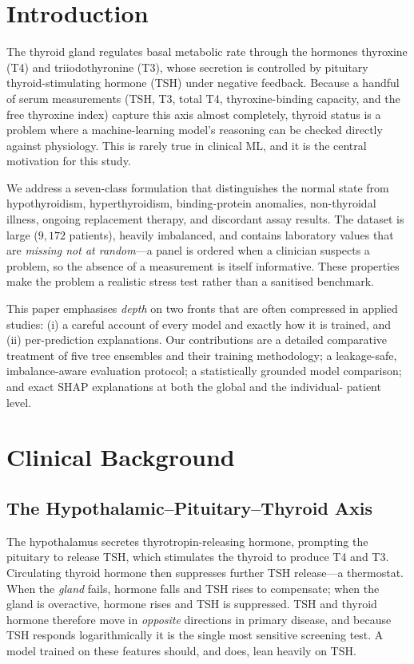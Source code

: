 \documentclass[conference]{IEEEtran}
\begin{document}
\section{Introduction}
The thyroid gland regulates basal metabolic rate through the hormones thyroxine
(T4) and triiodothyronine (T3), whose secretion is controlled by pituitary
thyroid-stimulating hormone (TSH) under negative feedback. Because a handful of
serum measurements (TSH, T3, total T4, thyroxine-binding capacity, and the free
thyroxine index) capture this axis almost completely, thyroid status is a problem
where a machine-learning model's reasoning can be checked directly against
physiology. This is rarely true in clinical ML, and it is the central motivation
for this study.

We address a seven-class formulation that distinguishes the normal state from
hypothyroidism, hyperthyroidism, binding-protein anomalies, non-thyroidal illness,
ongoing replacement therapy, and discordant assay results. The dataset is large
($9{,}172$ patients), heavily imbalanced, and contains laboratory values that are
\emph{missing not at random}---a panel is ordered when a clinician suspects a
problem, so the absence of a measurement is itself informative. These properties
make the problem a realistic stress test rather than a sanitised benchmark.

This paper emphasises \emph{depth} on two fronts that are often compressed in
applied studies: (i) a careful account of every model and exactly how it is
trained, and (ii) per-prediction explanations. Our contributions are a detailed
comparative treatment of five tree ensembles and their training methodology; a
leakage-safe, imbalance-aware evaluation protocol; a statistically grounded model
comparison; and exact SHAP explanations at both the global and the individual-
patient level.

\section{Clinical Background}
\subsection{The Hypothalamic--Pituitary--Thyroid Axis}
The hypothalamus secretes thyrotropin-releasing hormone, prompting the pituitary
to release TSH, which stimulates the thyroid to produce T4 and T3. Circulating
thyroid hormone then suppresses further TSH release---a thermostat. When the
\emph{gland} fails, hormone falls and TSH rises to compensate; when the gland is
overactive, hormone rises and TSH is suppressed. TSH and thyroid hormone therefore
move in \emph{opposite} directions in primary disease, and because TSH responds
logarithmically it is the single most sensitive screening test. A model trained on
these features should, and does, lean heavily on TSH.
\end{document}
